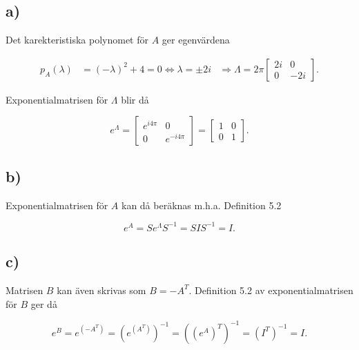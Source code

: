 \documentclass[a4paper]{article}
\newcommand{\mat}[1]{\bm{\mathit{#1}}}
\begin{document}
\subsection*{a)}

Det karekteristiska polynomet för $\mat{A}$ ger egenvärdena

\begin{align*}
  p_A(\lambda) &= (-\lambda)^2 + 4 = 0 \iff \lambda = \pm 2i
                 &\Rightarrow \mat{\Lambda} = 2\pi\begin{bmatrix}2i & 0\\0 & -2i\end{bmatrix}.
\end{align*}

\noindent Exponentialmatrisen för $\mat{\Lambda}$ blir då

\begin{equation*}
  e^{\mat{\Lambda}} = \begin{bmatrix}e^{i4\pi} & 0\\0 & e^{-i4\pi}\end{bmatrix} = \begin{bmatrix}1 & 0\\0 & 1\end{bmatrix}.
\end{equation*}

\subsection*{b)}

Exponentialmatrisen för $\mat{A}$ kan då beräknas m.h.a. Definition 5.2

\begin{equation*}
  e^{\mat{A}} = \mat{S}e^{\mat{\Lambda}}\mat{S}^{-1} = \mat{S}\mat{I}\mat{S}^{-1} = \mat{I}.
\end{equation*}

\subsection*{c)}

Matrisen $\mat{B}$ kan även skrivas som $\mat{B} = -\mat{A}^T$. Definition 5.2
av exponentialmatrisen för $\mat{B}$ ger då

\begin{equation*}
  e^{\mat{B}} = e^{\left( -\mat{A}^T \right)} = \left( e^{\left( \mat{A}^T \right)} \right)^{-1} = \left( \left( e^{\mat{A}} \right)^T \right)^{-1} = \left( \mat{I}^T \right)^{-1} = \mat{I}.
\end{equation*}
\end{document}

